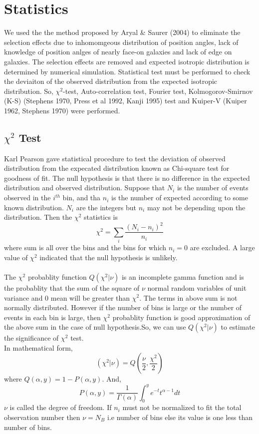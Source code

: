 \chapter{Statistics}
We used the the method proposed by Aryal \& Saurer (2004) to eliminate the selection effects due to inhomomgeous distribution of position angles, lack of knowledge of position anlges of nearly face-on galaxies and lack of edge on galaxies. The selection effects are removed and expected isotropic distribution is determined by numerical simulation. Statistical test must be performed to check the deviaiton of the observed distribution from the expected isotropic distribution. So, $\chi^2$-test, Auto-correlation test, Fourier test, Kolmogorov-Smirnov (K-S) (Stephens 1970, Press et al 1992, Kanji 1995) test and Kuiper-V (Kuiper 1962, Stephens 1970) were performed.
\section{$\chi^2$ Test}\label{chi}
Karl Pearson gave statistical procedure to test the deviation of observed distribution from the expecated distribution known as Chi-square test for goodness of fit. The null hypothesis is that there is no difference in the expected distribution and observed distribution. Suppose that $N_i$ is the number of events observed in the $i^{th}$ bin, and tha $n_i$ is the number of expected according to some known distribution. $N_i$ are the integers but $n_i$ may not be depending upon the distribution. Then the $\chi^2$ statistics is
 \begin{equation}
 \chi^2=\sum_i \frac{(N_i-n_i)^2}{n_i}
\end{equation} 
where sum is all over the bins and the bins for which $n_i=0$ are excluded. A large value of $\chi^2$ indicated that the null hypothesis is unlikely.\\\\
The $\chi^2$ probablity function $Q(\chi^2|\nu)$ is an incomplete gamma function and is the probablity that the sum of the square of $\nu$ normal random variables of unit variance and 0 mean will be greater than $\chi^2$. The terms in above sum is not normally distributed. However if the number of bins is large or the number of events in each bin is large, then $\chi^2$ probablity function is good approximation of the above sum in the case of null hypothesis.So, we can use $Q(\chi^2|\nu)$ to estimate the significance of $\chi^2$ test.\\
 In mathematical form,
 \begin{equation}
 (\chi^2|\nu)=Q\left(\frac{\nu}{2},\frac{\chi^2}{2}\right)
 \end{equation}
 where $Q(\alpha,y)=1-P(\alpha,y)$. And,
 \begin{equation}P(\alpha,y)=\frac{1}{\Gamma(\alpha)}\int_0^y e^{-t}t^{\alpha-1}dt\end{equation}
 $\nu$ is called the degree of freedom. If $n_i$ must not be normalized to fit the total observation number then $\nu=N_B$ i.e number of bins else its value is one less than number of bins.\\\\

